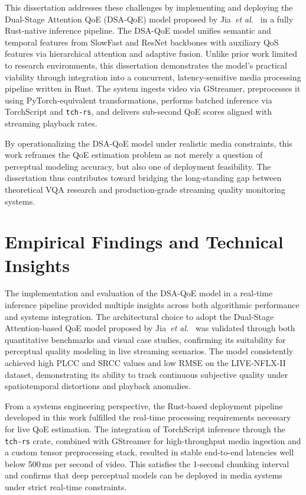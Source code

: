This dissertation addresses these challenges by implementing and deploying the Dual-Stage Attention QoE (DSA-QoE) model proposed by Jia~\textit{et al.}~\cite{jia2024continuous} in a fully Rust-native inference pipeline. The DSA-QoE model unifies semantic and temporal features from SlowFast and ResNet backbones with auxiliary QoS features via hierarchical attention and adaptive fusion. Unlike prior work limited to research environments, this dissertation demonstrates the model's practical viability through integration into a concurrent, latency-sensitive media processing pipeline written in Rust. The system ingests video via GStreamer, preprocesses it using PyTorch-equivalent transformations, performs batched inference via TorchScript and \texttt{tch-rs}, and delivers sub-second QoE scores aligned with streaming playback rates.

By operationalizing the DSA-QoE model under realistic media constraints, this work reframes the QoE estimation problem as not merely a question of perceptual modeling accuracy, but also one of deployment feasibility. The dissertation thus contributes toward bridging the long-standing gap between theoretical VQA research and production-grade streaming quality monitoring systems.

\section{Empirical Findings and Technical Insights}

The implementation and evaluation of the DSA-QoE model in a real-time inference pipeline provided multiple insights across both algorithmic performance and systems integration. The architectural choice to adopt the Dual-Stage Attention-based QoE model proposed by Jia~\textit{et al.}~\cite{jia2024continuous} was validated through both quantitative benchmarks and visual case studies, confirming its suitability for perceptual quality modeling in live streaming scenarios. The model consistently achieved high PLCC and SRCC values and low RMSE on the LIVE-NFLX-II dataset, demonstrating its ability to track continuous subjective quality under spatiotemporal distortions and playback anomalies.

From a systems engineering perspective, the Rust-based deployment pipeline developed in this work fulfilled the real-time processing requirements necessary for live QoE estimation. The integration of TorchScript inference through the \texttt{tch-rs} crate, combined with GStreamer for high-throughput media ingestion and a custom tensor preprocessing stack, resulted in stable end-to-end latencies well below 500\,ms per second of video. This satisfies the 1-second chunking interval and confirms that deep perceptual models can be deployed in media systems under strict real-time constraints.

